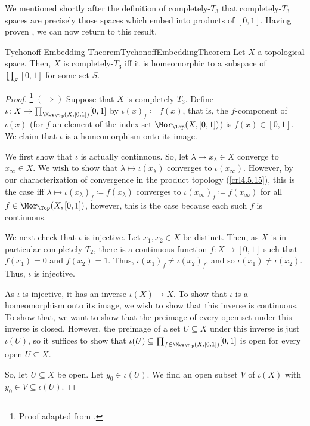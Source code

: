 We mentioned shortly after the definition of completely-$T_3$ that completely-$T_3$ spaces are precisely those spaces which embed into products of $[0,1]$.  Having proven , we can now return to this result.
\begin{thm}{Tychonoff Embedding Theorem}{TychonoffEmbeddingTheorem}
Let $X$ a topological space.  Then, $X$ is completely-$T_3$ iff it is homeomorphic to a subspace of $\prod _S[0,1]$ for some set $S$.
\begin{proof}\footnote{Proof adapted from \cite[Theorem 34.2]{Munkres}.}
$(\Rightarrow )$ Suppose that $X$ is completely-$T_3$.  Define $\iota \colon X\rightarrow \prod _{\Mor _{\Top}(X,[0,1])}[0,1]$ by $\iota (x)_f\coloneqq f(x)$, that is, the $f$-component of $\iota (x)$ (for $f$ an element of the index set $\Mor _{\Top}(X,[0,1])$) is $f(x)\in [0,1]$.  We claim that $\iota$ is a homeomorphism onto its image.

We first show that $\iota$ is actually continuous.  So, let $\lambda \mapsto x_{\lambda}\in X$ converge to $x_{\infty}\in X$.  We wish to show that $\lambda \mapsto \iota (x_{\lambda})$ converges to $\iota (x_{\infty})$.  However, by our characterization of convergence in the product topology (\cref{crl4.5.15}), this is the case iff $\lambda \mapsto \iota (x_{\lambda})_f\coloneqq f(x_{\lambda})$ converges to $\iota (x_{\infty})_f\coloneqq f(x_{\infty})$ for all $f\in \Mor _{\Top}(X,[0,1])$, however, this is the case because each such $f$ is continuous.

We next check that $\iota$ is injective.  Let $x_1,x_2\in X$ be distinct.  Then, as $X$ is in particular completely-$T_2$, there is a continuous function $f\colon X\rightarrow [0,1]$ such that $f(x_1)=0$ and $f(x_2)=1$.  Thus, $\iota (x_1)_f\neq \iota (x_2)_f$, and so $\iota (x_1)\neq \iota (x_2)$.  Thus, $\iota$ is injective.

As $\iota$ is injective, it has an inverse $\iota (X)\rightarrow X$.  To show that $\iota$ is a homeomorphism onto its image, we wish to show that this inverse is continuous.  To show that, we want to show that the preimage of every open set under this inverse is closed.  However, the preimage of a set $U\subseteq X$ under this inverse is just $\iota (U)$, so it suffices to show that $\iota (U)\subseteq \prod _{f\in \Mor _{\Top}(X,[0,1])}[0,1]$ is open for every open $U\subseteq X$.

So, let $U\subseteq X$ be open.  Let $y_0\in \iota (U)$.  We find an open subset $V$ of $\iota (X)$ with $y_0\in V\subseteq \iota (U)$.


\end{proof}
\end{thm}
